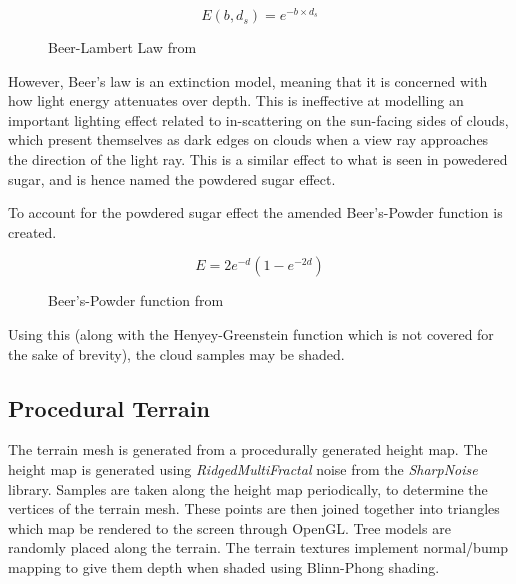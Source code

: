 \documentclass[10pt, openany]{book}
\begin{document}
\begin{figure}[H]
	\centering
	\[E(b,d_s) = e^{-b \times d_s}\]
	\caption[Beer-Lambert Law]{Beer-Lambert Law from \citep{volumetric-clouds}}
\end{figure}

However, Beer's law is an extinction model, meaning that it is concerned with how light energy attenuates over depth. This is ineffective at modelling an important lighting effect related to in-scattering on the sun-facing sides of clouds, which present themselves as dark edges on clouds when a view ray approaches the direction of the light ray. This is a similar effect to what is seen in powedered sugar, and is hence named the powdered sugar effect. \citep{gpupro7}

To account for the powdered sugar effect the amended Beer's-Powder function is created.
\begin{figure}[H]
	\centering
	\[E = 2e^{-d}(1-e^{-2d})\]
	\caption[Beer's-Powder function]{Beer's-Powder function from \citep{gpupro7}}
\end{figure}

Using this (along with the Henyey-Greenstein function which is not covered for the sake of brevity), the cloud samples may be shaded.

\subsection{Procedural Terrain}

The terrain mesh is generated from a procedurally generated height map. The height map is generated using \textit{RidgedMultiFractal} noise from the \textit{SharpNoise} library. Samples are taken along the height map periodically, to determine the vertices of the terrain mesh. These points are then joined together into triangles which map be rendered to the screen through \Gls{OpenGL}. Tree models are randomly placed along the terrain. The terrain textures implement normal/bump mapping to give them depth when shaded using Blinn-Phong shading.
\end{document}
